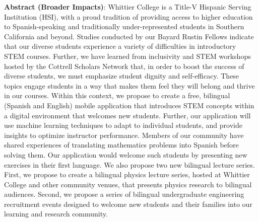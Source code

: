 \documentclass[../../main.tex]{subfiles}
\begin{document}
\textbf{Abstract (Broader Impacts)}: Whittier College is a Title-V Hispanic Serving Institution (HSI), with a proud tradition of providing access to higher education to Spanish-speaking and traditionally under-represented students in Southern California and beyond.  Studies conducted by our Bayard Rustin Fellows indicate that our diverse students experience a variety of difficulties in introductory STEM courses.  Further, we have learned from inclusivity and STEM workshops hosted by the Cottrell Scholars Network that, in order to boost the success of diverse students, we must emphasize student dignity and self-efficacy.  These topics engage students in a way that makes them feel they will belong and thrive in our courses.  Within this context, we propose to create a free, bilingual (Spanish and English) mobile application that introduces STEM concepts within a digital environment that welcomes new students.  Further, our application will use machine learning techniques to adapt to individual students, and provide insights to optimize instructor performance.  Members of our community have shared experiences of translating mathematics problems into Spanish before solving them.  Our application would welcome such students by presenting new exercises in their first language.  We also propose two new bilingual lecture series.  First, we propose to create a bilingual physics lecture series, hosted at Whittier College and other community venues, that presents physics research to bilingual audiences.  Second, we propose a series of bilingual undergraduate engineering recruitment events designed to welcome new students and their families into our learning and research community.

\clearpage
\end{document}
